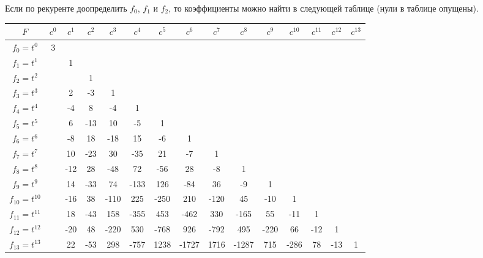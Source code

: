 \documentclass[12pt,a4paper]{article}
\begin{document}
    \begin{example}
        Если по рекуренте доопределить $f_0$, $f_1$ и $f_2$, то коэффициенты можно найти в следующей таблице (нули в таблице опущены).
        \begin{table}[H]
            \centering
            \begin{tabular}{c||c|c|c|c|c|c|c|c|c|c|c|c|c|c}
                $F$& $c^0$& $c^1$& $c^2$& $c^3$& $c^4$& $c^5$& $c^6$& $c^7$& $c^8$& $c^9$& $c^{10}$& $c^{11}$& $c^{12}$& $c^{13}$\\
                \hline
                \hline
                $f_0 = t^0$& 3&&&&&&&&&&&&&\\
                \hline
                $f_1 = t^1$&& 1&&&&&&&&&&&&\\
                \hline
                $f_2 = t^2$&&& 1&&&&&&&&&&&\\
                \hline
                $f_3 = t^3$&& 2& -3& 1&&&&&&&&&&\\
                \hline
                $f_4 = t^4$&& -4& 8& -4& 1&&&&&&&&&\\
                \hline
                $f_5 = t^5$&& 6& -13& 10& -5& 1&&&&&&&&\\
                \hline
                $f_6 = t^6$&& -8& 18& -18& 15& -6& 1&&&&&&&\\
                \hline
                $f_7 = t^7$&& 10& -23& 30& -35& 21& -7& 1&&&&&&\\
                \hline
                $f_8 = t^8$&& -12& 28& -48& 72& -56& 28& -8& 1&&&&&\\
                \hline
                $f_9 = t^9$&& 14& -33& 74& -133& 126& -84& 36& -9& 1&&&&\\
                \hline
                $f_{10} = t^{10}$&& -16& 38& -110& 225& -250& 210& -120& 45& -10& 1&&&\\
                \hline
                $f_{11} = t^{11}$&& 18& -43& 158& -355& 453& -462& 330& -165& 55& -11& 1&&\\
                \hline
                $f_{12} = t^{12}$&& -20& 48& -220& 530& -768& 926& -792& 495& -220& 66& -12& 1&\\
                \hline
                $f_{13} = t^{13}$&& 22& -53& 298& -757& 1238& -1727& 1716& -1287& 715& -286& 78& -13& 1\\
            \end{tabular}
        \end{table}
    \end{example}
\end{document}
